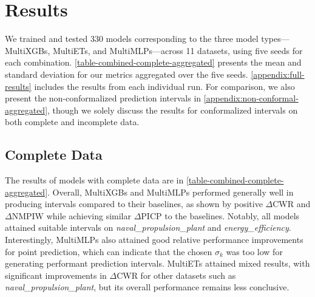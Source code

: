 \documentclass{article}
\begin{document}
\section{Results}
\label{results}
We trained and tested 330 models corresponding to the three model types—MultiXGBs, MultiETs, and MultiMLPs—across 11 datasets,
using five seeds for each combination. \autoref{table-combined-complete-aggregated} 
presents the mean and standard deviation for our metrics aggregated over the five seeds. \autoref{appendix:full-results} includes the results from each individual run. For comparison, we also present the non-conformalized prediction intervals in \autoref{appendix:non-conformal-aggregated}, though we solely discuss the results for conformalized intervals on both complete and incomplete data.

\subsection{Complete Data}
The results of models with complete data are in \autoref{table-combined-complete-aggregated}. Overall, MultiXGBs and MultiMLPs performed generally well in producing intervals compared to their baselines, as shown by positive $\Delta$CWR and $\Delta$NMPIW while achieving similar $\Delta$PICP to the baselines. Notably, all models attained suitable intervals on \textit{naval\_propulsion\_plant} and \textit{energy\_efficiency}. Interestingly, MultiMLPs also attained good relative performance improvements for point prediction, which can indicate that the chosen $\sigma_{k}$ was too low for generating performant prediction intervals. MultiETs attained mixed results, with significant improvements in $\Delta$CWR for other datasets such as \textit{naval\_propulsion\_plant}, but its overall performance remains less conclusive.


% 
\end{document}

